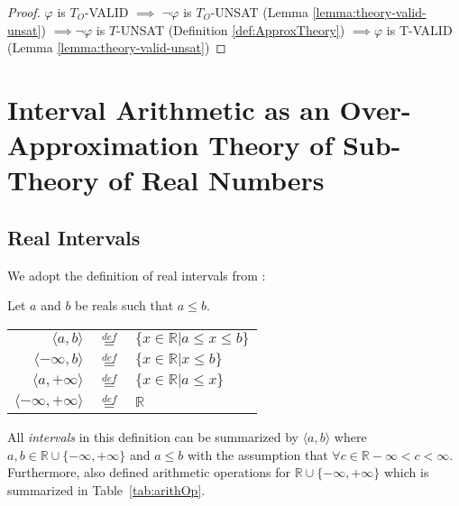 \begin{proof}
$\varphi$ is $T_O$-VALID $\implies$ $\neg\varphi$ is $T_O$-UNSAT (Lemma \ref{lemma:theory-valid-unsat}) $\implies \neg\varphi$ is $T$-UNSAT (Definition \ref{def:ApproxTheory}) $\implies \varphi$ is T-VALID (Lemma \ref{lemma:theory-valid-unsat})
\end{proof}


\section{Interval Arithmetic as an Over-Approximation Theory of Sub-Theory of Real Numbers}\label{sec:IA}
\subsection{Real Intervals}
We adopt the definition of real intervals from \cite{Hickey:2001:IAP:502102.502106}:
\begin{definition}\cite{Hickey:2001:IAP:502102.502106}
Let $a$ and $b$ be reals such that $a \le b$.
\begin{center}
\begin{tabular}{ r c l }
  $\langle a, b \rangle$ & $\overset{def}{=}$ & $\{x \in \mathbb{R} | a \le x \le b\}$ \\
  $\langle -\infty, b \rangle$ & $\overset{def}{=}$ & $\{x \in \mathbb{R} | x \le b\}$ \\
  $\langle a, +\infty \rangle$ & $\overset{def}{=}$ & $\{x \in \mathbb{R} | a \le x\}$ \\  
  $\langle -\infty, +\infty \rangle$ & $\overset{def}{=}$ & $\mathbb{R}$ \\  
\end{tabular}
\end{center}
\end{definition}
All \emph{intervals} in this definition can be summarized by $\langle a, b \rangle$ where $a, b \in \mathbb{R} \cup \{-\infty, +\infty\}$ and $a \le b$ with the assumption that $\forall c \in \mathbb{R}-\infty < c < \infty$. Furthermore,\citet{Hickey:2001:IAP:502102.502106} also defined arithmetic operations for $\mathbb{R} \cup \{-\infty, +\infty\}$ which is summarized in Table~\ref{tab:arithOp}.

